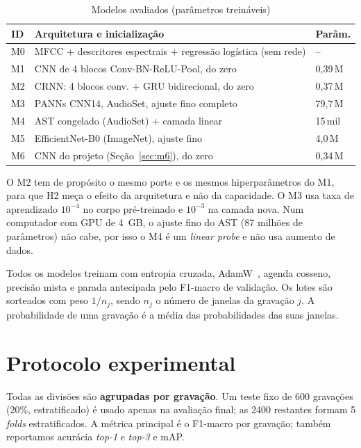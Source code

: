 \documentclass[conference]{IEEEtran}
\begin{document}
\begin{table}[htbp]
\caption{Modelos avaliados (parâmetros treináveis)}
\label{tab:modelos}
\centering
\footnotesize
\setlength{\tabcolsep}{3pt}
\begin{tabular}{@{}l>{\raggedright\arraybackslash}p{4.3cm}l@{}}
\toprule
\textbf{ID} & \textbf{Arquitetura e inicialização} & \textbf{Parâm.} \\
\midrule
M0 & MFCC + descritores espectrais + regressão logística (sem rede) & -- \\
M1 & CNN de 4 blocos Conv-BN-ReLU-Pool, do zero & 0,39\,M \\
M2 & CRNN: 4 blocos conv. + GRU bidirecional, do zero & 0,37\,M \\
M3 & PANNs CNN14, AudioSet, ajuste fino completo & 79,7\,M \\
M4 & AST congelado (AudioSet) + camada linear & 15\,mil \\
M5 & EfficientNet-B0 (ImageNet), ajuste fino & 4,0\,M \\
M6 & CNN do projeto (Seção~\ref{sec:m6}), do zero & 0,34\,M \\
\bottomrule
\end{tabular}
\end{table}

O M2 tem de propósito o mesmo porte e os mesmos hiperparâmetros do M1, para que H2 meça o efeito da arquitetura e não da capacidade. O M3 usa taxa de aprendizado $10^{-4}$ no corpo pré-treinado e $10^{-3}$ na camada nova. Num computador com GPU de 4~GB, o ajuste fino do AST (87 milhões de parâmetros) não cabe, por isso o M4 é um \textit{linear probe} e não usa aumento de dados.

Todos os modelos treinam com entropia cruzada, AdamW~\cite{loshchilov2019adamw}, agenda cosseno, precisão mista e parada antecipada pelo F1-macro de validação. Os lotes são sorteados com peso $1/n_j$, sendo $n_j$ o número de janelas da gravação $j$. A probabilidade de uma gravação é a média das probabilidades das suas janelas.

\section{Protocolo experimental}

Todas as divisões são \textbf{agrupadas por gravação}. Um teste fixo de 600 gravações (20\%, estratificado) é usado apenas na avaliação final; as 2400 restantes formam 5 \textit{folds} estratificados. A métrica principal é o F1-macro por gravação; também reportamos acurácia \textit{top-1} e \textit{top-3} e mAP.
\end{document}
